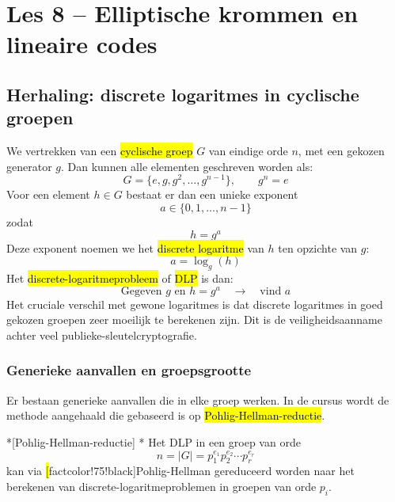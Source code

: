 \section{Les 8 -- Elliptische krommen en lineaire codes}

\subsection*{Herhaling: discrete logaritmes in cyclische groepen}

We vertrekken van een \hl{cyclische groep} $G$ van eindige orde $n$, met een gekozen generator $g$. Dan kunnen alle elementen geschreven worden als:
\begin{equation*}
    G = \{e, g, g^2, \dots, g^{n-1}\}, \qquad g^n = e
\end{equation*}
Voor een element $h \in G$ bestaat er dan een unieke exponent
\begin{equation*}
    a \in \{0, 1, \dots, n-1\}
\end{equation*}
zodat
\begin{equation*}
    h = g^a
\end{equation*}
Deze exponent noemen we het \hl{discrete logaritme} van $h$ ten opzichte van $g$:
\begin{equation*}
    a = \log_g(h)
\end{equation*}
Het \hl{discrete-logaritmeprobleem} of \hl{DLP} is dan:
\begin{equation*}
    \text{Gegeven } g \text{ en } h = g^a \quad \to \quad \text{vind } a
\end{equation*}
Het cruciale verschil met gewone logaritmes is dat discrete logaritmes in goed gekozen groepen zeer moeilijk te berekenen zijn. Dit is de veiligheidsaanname achter veel publieke-sleutelcryptografie.

\subsubsection*{Generieke aanvallen en groepsgrootte}

Er bestaan generieke aanvallen die in elke groep werken. In de cursus wordt de methode aangehaald die gebaseerd is op \hl{Pohlig-Hellman-reductie}.

\begin{nicefact}*[Pohlig-Hellman-reductie]
    \nextpart[]*
    Het DLP in een groep van orde
    \begin{equation*}
        n = |G| = p_1^{e_1} p_2^{e_2} \cdots p_r^{e_r}
    \end{equation*}
    kan via \hl[factcolor!75!black]{Pohlig-Hellman} gereduceerd worden naar het berekenen van discrete-logaritmeproblemen in groepen van orde $p_i$.
\end{nicefact}


